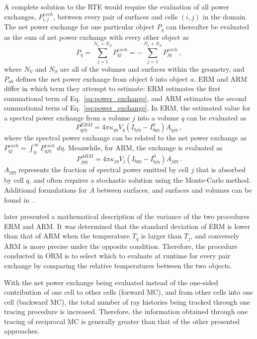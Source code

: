 A complete solution to the RTE would require the evaluation of all power exchanges, $P_{i,j}^{exch}$, between every pair of surfaces and cells $(i,j)$ in the domain.
The net power exchange for one particular object $P_q$ can thereafter be evaluated as the sum of net power exchange with every other object as
\begin{equation}
    P_q=\sum_{j=1}^{N_v+N_S}P_{qj}^{exch}=-\sum_{j=1}^{N_v+N_S}P_{jq}^{exch}~,
    \label{eq:power_exchange}
\end{equation}
where $N_V$ and $N_S$ are all of the volumes and surfaces within the geometry, and
$P_{ab}$ defines the net power exchange from object $b$ into object $a$.
ERM and ARM differ in which term they attempt to estimate: ERM estimates the first summational term of Eq.~\ref{eq:power_exchange}, and ARM estimates the second summational term of Eq.~\ref{eq:power_exchange}.
In ERM, the estimated value for a spectral power exchange from a volume $j$ into a volume $q$ can be evaluated as
\begin{equation}
    P_{qj\eta}^{ERM}=4\pi{}\kappa_{q\eta}V_q(I_{bj\eta}-I^0_{bq\eta})A_{qj\eta}~,
    \label{eq:fraction_spectralpower_ERM}
\end{equation}
where the spectral power exchange can be related to the net power exchange as $P_{qj}^{exch}=\int_0^\infty{}P_{qj\eta}^{exch}~d\eta$.
Meanwhile, for ARM, the exchange is evaluated as
\begin{equation}
    P_{jq\eta}^{ARM}=4\pi{}\kappa_{j\eta}V_j(I_{bq\eta}-I^0_{bj\eta})A_{jq\eta}~.
    \label{eq:power_exchange_ARM}
\end{equation}
$A_{jq\eta}$ represents the fraction of spectral power emitted by cell $j$ that is absorbed by cell $q$, and often requires a stochastic solution using the Monte-Carlo method. Additional formulations for $A$ between surfaces, and surfaces and volumes can be found in~\citet{Dupoirieux2006AnThicknesses}.

\citet{Dupoirieux2006AnThicknesses} later presented a mathematical description of the variance of the two procedures ERM and ARM. It was determined that the standard deviation of ERM is lower than that of ARM when the temperature $T_q$ is larger than $T_j$, and conversely ARM is more precise under the opposite condition.
Therefore, the procedure conducted in ORM is to select which to evaluate at runtime for every pair exchange by comparing the relative temperatures between the two objects.

With the net power exchange being evaluated instead of the one-sided contribution of one cell to other cells (forward MC), and from other cells into one cell (backward MC), the total number of ray histories being tracked through one tracing procedure is increased.
Therefore, the information obtained through one tracing of reciprocal MC is generally greater than that of the other presented approaches.


